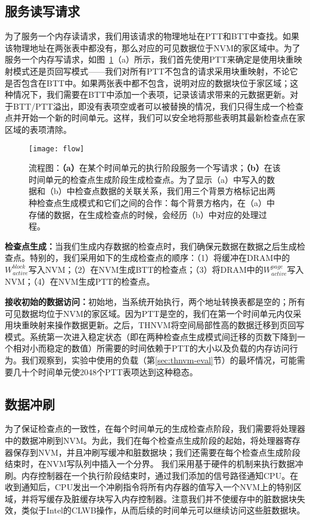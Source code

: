 \subsection{服务读写请求}

为了服务一个内存读请求，我们用该请求的物理地址在PTT和BTT中查找。如果该物理地址在两张表中都没有，那么对应的可见数据位于NVM的家区域中。为了服务一个内存写请求，如图~\ref{fig:flow}（a）所示，我们首先使用PTT来确定是使用块重映射模式还是页回写模式——我们对所有PTT不包含的请求采用块重映射，不论它是否包含在BTT中。如果两张表中都不包含，说明对应的数据块位于家区域；这种情况下，我们需要在BTT中添加一个表项，记录该请求带来的元数据更新。对于BTT/PTT溢出，即没有表项空或者可以被替换的情况，我们只得生成一个检查点并开始一个新的时间单元。这样，我们可以安全地将那些表明其最新检查点在家区域的表项清除。

\begin{figure}[!h]
\centering
\texttt{[image: flow]}
\caption{流程图：\textbf{（a）}在某个时间单元的执行阶段服务一个写请求；\textbf{（b）}在该时间单元的检查点生成阶段生成检查点。为了显示（a）中写入的数据和（b）中检查点数据的关联关系，我们用三个背景方格标记出两种检查点生成模式和它们之间的合作：每个背景方格内，在（a）中存储的数据，在生成检查点的时候，会经历（b）中对应的处理过程。}
\label{fig:flow}
\end{figure}

\textbf{检查点生成：}当我们生成内存数据的检查点时，我们确保元数据在数据之后生成检查点。特别的，我们采用如下的生成检查点的顺序：（1）将缓冲在DRAM中的$W^{block}_{active}$写入NVM；（2）在NVM生成BTT的检查点；（3）将DRAM中的$W^{page}_{active}$写入NVM；（4）在NVM生成PTT的检查点。

\textbf{接收初始的数据访问：}初始地，当系统开始执行，两个地址转换表都是空的；所有可见数据均位于NVM的家区域。因为PTT是空的，我们在第一个时间单元内仅采用块重映射来操作数据更新。之后，THNVM将空间局部性高的数据迁移到页回写模式。系统第一次进入稳定状态（即在两种检查点生成模式间迁移的页数下降到一个相对小而稳定的数值）所需要的时间依赖于PTT的大小以及负载的内存访问行为。我们观察到，实验中使用的负载（第\ref{sec:thnvm-eval}节）的最坏情况，可能需要几十个时间单元使2048个PTT表项达到这种稳态。

\subsection{数据冲刷}

为了保证检查点的一致性，在每个时间单元的生成检查点阶段，我们需要将处理器中的数据冲刷到NVM。为此，我们在每个检查点生成阶段的起始，将处理器寄存器保存到NVM，并且冲刷写缓冲和脏数据块；我们还需要在每个检查点生成阶段结束时，在NVM写队列中插入一个分界。 
我们采用基于硬件的机制来执行数据冲刷。内存控制器在一个执行阶段结束时，通过我们添加的信号路径通知CPU。在收到通知后，CPU发出一个冲刷指令将所有内存器的值写入一个NVM上的特别区域，并将写缓存及脏缓存块写入内存控制器。注意我们并不使缓存中的脏数据块失效，类似于Intel的CLWB操作，从而后续的时间单元可以继续访问这些脏数据块。

